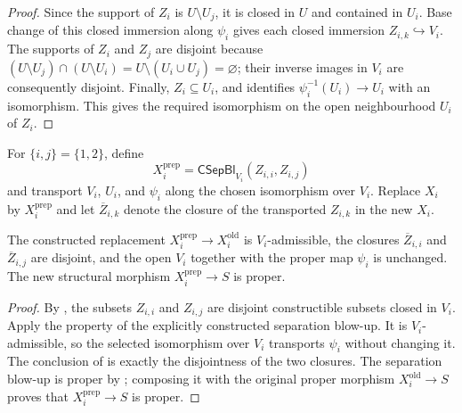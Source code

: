 \begin{proof}
  \leanok
  Since the support of $Z_i$ is $U\setminus U_j$, it is closed in $U$ and
  contained in $U_i$.  Base change of this closed immersion along $\psi_i$
  gives each closed immersion $Z_{i,k}\hookrightarrow V_i$.  The supports of
  $Z_i$ and $Z_j$ are disjoint because
  $(U\setminus U_j)\cap(U\setminus U_i)=U\setminus(U_i\cup U_j)=\varnothing$;
  their inverse images in $V_i$ are consequently disjoint.  Finally,
  $Z_i\subseteq U_i$, and  identifies
  $\psi_i^{-1}(U_i)\to U_i$ with an isomorphism.  This gives the required
  isomorphism on the open neighbourhood $U_i$ of $Z_i$.
\end{proof}

\begin{definition}
  \label{def:nagata-two-open-prepared-boundaries}
  \leanok

  For $\{i,j\}=\{1,2\}$, define
  \[
    X_i^{\mathrm{prep}}
      =\mathsf{CSepBl}_{V_i}(Z_{i,i},Z_{i,j})
  \]
  and transport $V_i$, $U_i$, and $\psi_i$ along the chosen isomorphism over
  $V_i$.  Replace $X_i$ by $X_i^{\mathrm{prep}}$ and let
  $\overline Z_{i,k}$ denote the closure of the transported $Z_{i,k}$ in the
  new $X_i$.
\end{definition}

\begin{lemma}
  \label{lemma:nagata-prepared-boundaries}
  \leanok

  The constructed replacement $X_i^{\mathrm{prep}}\to X_i^{\mathrm{old}}$
  is $V_i$-admissible, the closures
  $\overline Z_{i,i}$ and $\overline Z_{i,j}$ are disjoint, and the open
  $V_i$ together with the proper map $\psi_i$ is unchanged.  The new
  structural morphism $X_i^{\mathrm{prep}}\to S$ is proper.
\end{lemma}

\begin{proof}
  \leanok
  By , the subsets $Z_{i,i}$ and
  $Z_{i,j}$ are disjoint constructible subsets closed in $V_i$.  Apply the
  property of the explicitly constructed separation blow-up.  It is
  $V_i$-admissible, so the selected isomorphism over $V_i$ transports
  $\psi_i$ without changing it.  The conclusion of
   is exactly the
  disjointness of the two closures.  The separation blow-up is proper by
  ; composing it with the original proper
  morphism $X_i^{\mathrm{old}}\to S$ proves that
  $X_i^{\mathrm{prep}}\to S$ is proper.
\end{proof}


